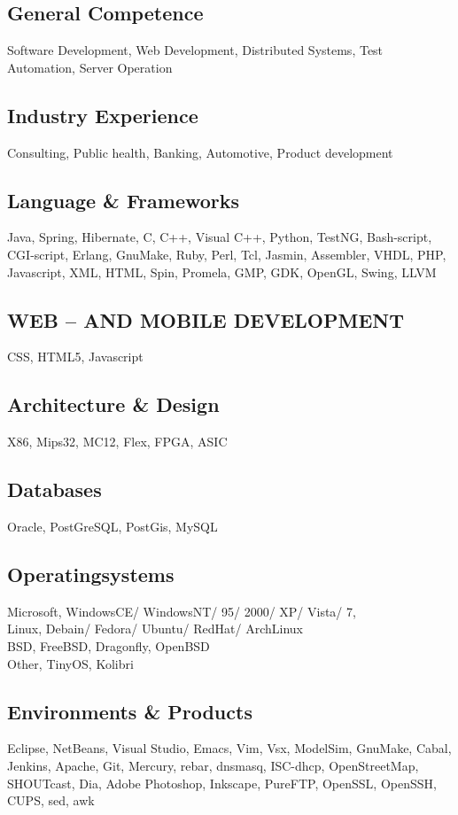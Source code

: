 \documentclass[fontsize=10pt]{tccv}
\begin{document}
\subsection{General Competence}
Software Development,
Web Development,
Distributed Systems,
Test Automation,
Server Operation

\subsection{Industry Experience}
Consulting,
Public health,
Banking,
Automotive,
Product development

\subsection{Language \& Frameworks}
Java, Spring, Hibernate, C, C++, Visual C++, Python, TestNG, Bash-script, CGI-script, Erlang, GnuMake, Ruby, Perl, Tcl, Jasmin, Assembler, VHDL, PHP, Javascript, XML, HTML, Spin, Promela, GMP, GDK, OpenGL, Swing, LLVM
\subsection{WEB – AND MOBILE DEVELOPMENT}
        CSS, HTML5, Javascript


\subsection{Architecture \& Design}
X86, Mips32, MC12, Flex, FPGA, ASIC

\subsection{Databases}
Oracle, PostGreSQL, PostGis, MySQL

\subsection{Operatingsystems}
Microsoft, WindowsCE/ WindowsNT/ 95/ 2000/ XP/ Vista/ 7,
\\
Linux, Debain/ Fedora/ Ubuntu/ RedHat/ ArchLinux
\\
BSD, FreeBSD, Dragonfly, OpenBSD
\\
Other, TinyOS, Kolibri

\subsection{Environments \& Products}
Eclipse, NetBeans, Visual Studio, Emacs, Vim, Vsx, ModelSim, GnuMake, Cabal,
Jenkins, Apache, Git, Mercury, rebar, dnsmasq, ISC-dhcp, OpenStreetMap,
SHOUTcast, Dia, Adobe Photoshop, Inkscape, PureFTP, OpenSSL, OpenSSH, CUPS,
sed, awk
\end{document}
